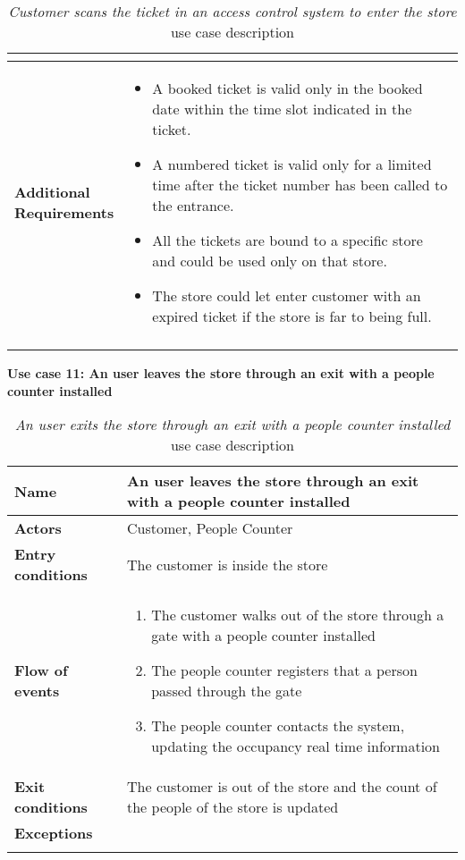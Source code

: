 \begin{longtable}{p{0.25\linewidth}p{0.75\linewidth}}
\begin{itemize}
    \end{itemize}  \\
    \bottomrule
    \textbf{Additional \linebreak Requirements} &
    \begin{itemize}
        \item A booked ticket is valid only in the booked date within the time slot indicated in the ticket.
        \item A numbered ticket is valid only for a limited time after the ticket number has been called to the entrance. 
        \item All the tickets are bound to a specific store and could be used only on that store.
        \item The store could let enter customer with an expired ticket if the store is far to being full. 
    \end{itemize} \\
    \bottomrule
    \caption{\emph{Customer scans the ticket in an access control system to enter the store} use case description}
    \end{longtable}

    \clearpage
    \textbf{Use case 11: An user leaves the store through an exit with a people counter installed}
    \smallskip
    \begin{longtable}{p{0.25\linewidth}p{0.75\linewidth}}
    \toprule
    \textbf{Name} & \textbf{An user leaves the store through an exit with a people counter installed} \\
    \midrule
    \textbf{Actors} & Customer, People Counter\\
    \midrule
    \textbf{Entry conditions} & The customer is inside the store\\
    \midrule
    \textbf{Flow of events} & 
    \begin{enumerate}
        \item The customer walks out of the store through a gate with a people counter installed
        \item The people counter registers that a person passed through the gate
        \item The people counter contacts the system, updating the occupancy real time information
    \end{enumerate} \\
    \midrule
    \textbf{Exit conditions} & The customer is out of the store and the count of the people of the store is updated\\
    \midrule
    \textbf{Exceptions} & \\
    \bottomrule
    \caption{\emph{An user exits the store through an exit with a people counter installed} use case description}
    \end{longtable}


